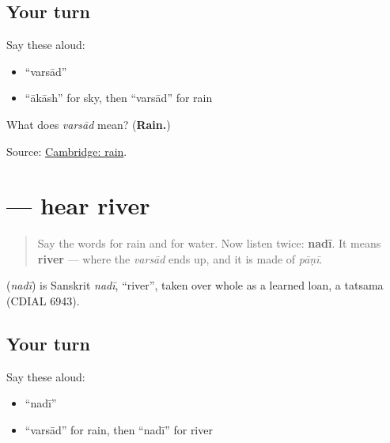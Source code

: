 \subsection*{Your turn}
Say these aloud:

\begin{itemize}
\raggedright
  \item \textquotedblleft{}varsād\textquotedblright{}
  \item \textquotedblleft{}ākāsh\textquotedblright{} for sky, then \textquotedblleft{}varsād\textquotedblright{} for rain
\end{itemize}

\begin{tcolorbox}[breakable,colback=teal!4,colframe=teal!35!black,title={Before you move on}]
What does \emph{varsād} mean? (\textbf{Rain.})

Source: \href{https://dictionary.cambridge.org/dictionary/english-gujarati/rain}{Cambridge: rain}.
\end{tcolorbox}
\section[\texorpdfstring{\gu{નદી} (nadī)}{નદી (nadī)}]{ — hear river}

\label{lesson:GU-C29-hear-nadi}



\begin{quote}
Say the words for rain and for water. Now listen twice: \textbf{nadī}. It means \textbf{river} — where the \emph{varsād} ends up, and it is made of \emph{pāṇī}.
\end{quote}

\begin{cousinweb}
\textbf{} (\emph{nadī}) is Sanskrit \emph{nadī}, \textquotedblleft{}river\textquotedblright{}, taken over whole as a learned loan, a tatsama (CDIAL 6943).
\end{cousinweb}

\subsection*{Your turn}
Say these aloud:

\begin{itemize}
\raggedright
  \item \textquotedblleft{}nadī\textquotedblright{}
  \item \textquotedblleft{}varsād\textquotedblright{} for rain, then \textquotedblleft{}nadī\textquotedblright{} for river
\end{itemize}

